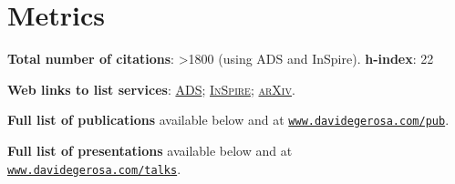\documentclass[a4paper]{moderncv}
\begin{document}
\section{Metrics}

\textcolor{mark_color}{\textbf{Total number of citations}}:  {>1800}  (using ADS and InSpire).
\textcolor{mark_color}{\textbf{h-index}}: 22

\textcolor{mark_color}{\textbf{Web links to list services}}:
\href{https://ui.adsabs.harvard.edu/search/fq=%7B!type%3Daqp%20v%3D%24fq_doctype%7D&fq_doctype=(doctype%3A%22misc%22%20OR%20doctype%3A%22inproceedings%22%20OR%20doctype%3A%22article%22%20OR%20doctype%3A%22eprint%22)&q=%20author%3A%22Gerosa%2C%20Davide%22&sort=citation_count%20desc%2C%20bibcode%20desc&p_=0}{\textsc{ADS}};
\href{http://inspirehep.net/search?ln=en&ln=en&p=exactauthor%3AD.Gerosa.1&of=hb&action_search=Search&sf=&so=d&rm=citation&rg=25&sc=0}{\textsc{InSpire}};
\href{http://arxiv.org/a/gerosa_d_1.html}{\textsc{arXiv}}.

\textbf{Full list of publications} available below and at \href{http://www.davidegerosa.com/pub}{\texttt{www.davidegerosa.com/pub}}.
\vspace{0.2cm}


\textbf{Full list of presentations} available below and at \href{http://www.davidegerosa.com/talks}{\texttt{www.davidegerosa.com/talks}}.
\end{document}
